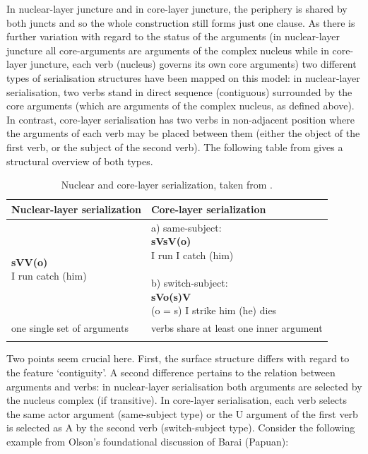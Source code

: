 In nuclear-layer juncture and in core-layer juncture, the periphery is shared by both juncts and so the whole construction still forms just one clause. As there is further variation with regard to the status of the arguments (in nuclear-layer juncture all core-arguments are arguments of the complex nucleus while in core-layer juncture, each verb (nucleus) governs its own core arguments) two different types of serialisation structures have been mapped on this model: in nuclear-layer serialisation, two verbs stand in direct sequence (contiguous) surrounded by the core arguments (which are arguments of the complex nucleus, as defined above). In contrast, core-layer serialisation has two verbs in non-adjacent position where the arguments of each verb may be placed between them (either the object of the first verb, or the subject of the second verb). The following table from \citet{bril2004complex} gives a structural overview of both types.

\begin{table}
\begin{footnotesize}
\begin{tabular}{ll}
\lsptoprule 
\textbf{Nuclear-layer serialization} & \textbf{Core-layer serialization} \\
\hline 
\pbox[c]{0.5\textwidth}{\textbf{sVV(o)} \\
 I run catch (him) } & 
 \pbox[c]{0.5\textwidth}{ a) same-subject: \\ \textbf{sVsV(o)} \\
 I run I catch (him) \\  \\
 b) switch-subject: \\ \textbf{sVo(s)V} \\ 
 (o = s) I strike him (he) dies }  \\
\hline
one single set of arguments & verbs share at least one inner argument \\
\lspbottomrule
\end{tabular}
\end{footnotesize}
\caption[Nuclear and core-layer serialization]{Nuclear and core-layer serialization, taken from \citet[4]{bril2004complex}.}
\end{table}

Two points seem crucial here. First, the surface structure differs with regard to the feature `contiguity'. A second difference pertains to the relation between arguments and verbs: in nuclear-layer serialisation both arguments are selected by the nucleus complex (if transitive). In core-layer serialisation, each verb selects the same actor argument (same-subject type) or the U argument of the first verb is selected as A by the second verb (switch-subject type). Consider the following example from Olson's \citep{olson1981barai} foundational discussion of Barai (Papuan):

